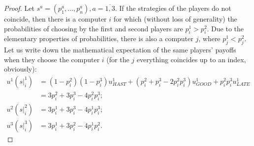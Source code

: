 \begin{proof}
	Let $s^a = (p_1^a, \ldots, p_n^a), a = \overline{1,3}$. If the strategies of the players do not coincide, then there is a computer $i$ for which (without loss of generality) the probabilities of choosing by the first and second players are $p_i^1 > p_i^2$. Due to the elementary properties of probabilities, there is also a computer $j$, where $p_j^1 < p_j^2$. Let us write down the mathematical expectation of the same players' payoffs when they choose the computer $i$ (for the $j$ everything coincides up to an index, obviously): %
	\begin{align*}
		u^1(\left. s \right|^1_i) &= (1 - p_i^2) (1 - p_i^3) u^1_{HAST} + (p_i^2 + p_i^3 - 2 p_i^2 p_i^3) u^1_{GOOD} + p_i^2 p_i^3 u^1_{LATE}\\ &= 3 p_i^2 + 3 p_i^3 - 4 p_i^2 p_i^3;\\
		u^2(\left. s \right|^2_i) &= 3 p_i^1 + 3 p_i^3 - 4 p_i^1 p_i^3;\\
		u^3(\left. s \right|^3_i) &= 3 p_i^1 + 3 p_i^2 - 4 p_i^1 p_i^2.
	\end{align*}
	

\end{proof}
